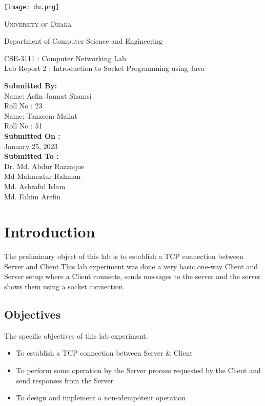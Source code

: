 \documentclass[11pt]{article}
\begin{document}
\begin{titlepage}
	\begin{center}
    	\texttt{[image: du.png]}\par
		\begin{Huge}
			\textsc{University of Dhaka}\par
		\end{Huge}
		\begin{Large}
			Department of Computer Science and Engineering\par \vspace{1cm}
			CSE-3111 : Computer Networking Lab \\[12pt]	
			Lab Report 2 : Introduction to Socket Programming using Java
		\end{Large}
	\end{center}  	
	\begin{large}
		\textbf{Submitted By:\\[12pt]}
			Name: Asfin Jannat Shamsi\\[8pt]
			Roll No : 23\\[12pt]
            Name: Tanzeem Maliat\\[8pt]
			Roll No : 51\\[12pt]
		\textbf{Submitted On : \\[12pt]}
			January 25, 2023\\[20pt]
		\textbf{Submitted To :\\[12pt]}
			Dr. Md. Abdur Razzaque\\[12pt]
                Md Mahmudur Rahman\\[12pt]
                Md. Ashraful Islam\\[12pt]
                Md. Fahim Arefin
	\end{large}
\end{titlepage}

\section{Introduction}
The preliminary object of this lab is to establish a TCP connection between Server and Client.This lab experiment was done a very basic one-way Client and Server setup where a Client connects, sends messages to the server and the server shows them using a socket connection. 

\subsection{Objectives}
The specific objectives of this lab experiment.
\begin{itemize}
    \item To establish a TCP connection between Server & Client
    \item To perform some operation by the Server process requested by the
Client and send responses from the Server
    \item To design and implement a non-idempotent operation
\end{itemize}
\end{document}
